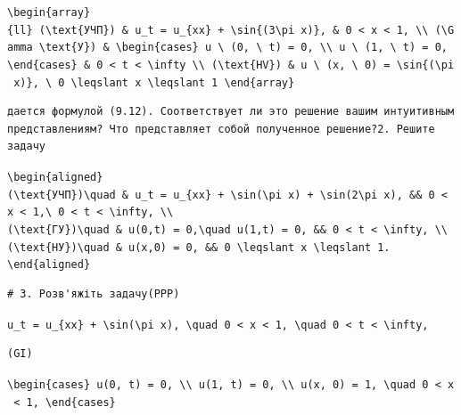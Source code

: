 \documentclass[
  ukrainian,
]{article}
\begin{document}
\texttt{\textbackslash{}begin\{array\}\{ll\}\ (\textbackslash{}text\{УЧП\})\ \&\ u\_t\ =\ u\_\{xx\}\ +\ \textbackslash{}sin\{(3\textbackslash{}pi\ x)\},\ \&\ 0\ \textless{}\ x\ \textless{}\ 1,\ \textbackslash{}\textbackslash{}\ (\textbackslash{}Gamma\ \textbackslash{}text\{У\})\ \&\ \textbackslash{}begin\{cases\}\ u\ \textbackslash{}\ (0,\ \textbackslash{}\ t)\ =\ 0,\ \textbackslash{}\textbackslash{}\ u\ \textbackslash{}\ (1,\ \textbackslash{}\ t)\ =\ 0,\ \textbackslash{}end\{cases\}\ \&\ 0\ \textless{}\ t\ \textless{}\ \textbackslash{}infty\ \textbackslash{}\textbackslash{}\ (\textbackslash{}text\{HV\})\ \&\ u\ \textbackslash{}\ (x,\ \textbackslash{}\ 0)\ =\ \textbackslash{}sin\{(\textbackslash{}pi\ x)\},\ \textbackslash{}\ 0\ \textbackslash{}leqslant\ x\ \textbackslash{}leqslant\ 1\ \textbackslash{}end\{array\}}

\begin{verbatim}
дается формулой (9.12). Соответствует ли это решение вашим интуитивным представлениям? Что представляет собой полученное решение?2. Решите задачу
\end{verbatim}

\texttt{\textbackslash{}begin\{aligned\}}
\texttt{(\textbackslash{}text\{УЧП\})\textbackslash{}quad\ \&\ u\_t\ =\ u\_\{xx\}\ +\ \textbackslash{}sin(\textbackslash{}pi\ x)\ +\ \textbackslash{}sin(2\textbackslash{}pi\ x),\ \&\&\ 0\ \textless{}\ x\ \textless{}\ 1,\textbackslash{}\ 0\ \textless{}\ t\ \textless{}\ \textbackslash{}infty,\ \textbackslash{}\textbackslash{}}
\texttt{(\textbackslash{}text\{ГУ\})\textbackslash{}quad\ \&\ u(0,t)\ =\ 0,\textbackslash{}quad\ u(1,t)\ =\ 0,\ \&\&\ 0\ \textless{}\ t\ \textless{}\ \textbackslash{}infty,\ \textbackslash{}\textbackslash{}}
\texttt{(\textbackslash{}text\{НУ\})\textbackslash{}quad\ \&\ u(x,0)\ =\ 0,\ \&\&\ 0\ \textbackslash{}leqslant\ x\ \textbackslash{}leqslant\ 1.}
\texttt{\textbackslash{}end\{aligned\}}

\begin{verbatim}
# 3. Розв'яжіть задачу(PPP)
\end{verbatim}

\texttt{u\_t\ =\ u\_\{xx\}\ +\ \textbackslash{}sin(\textbackslash{}pi\ x),\ \textbackslash{}quad\ 0\ \textless{}\ x\ \textless{}\ 1,\ \textbackslash{}quad\ 0\ \textless{}\ t\ \textless{}\ \textbackslash{}infty,}

\begin{verbatim}
(GI)
\end{verbatim}

\texttt{\textbackslash{}begin\{cases\}\ u(0,\ t)\ =\ 0,\ \textbackslash{}\textbackslash{}\ u(1,\ t)\ =\ 0,\ \textbackslash{}\textbackslash{}\ u(x,\ 0)\ =\ 1,\ \textbackslash{}quad\ 0\ \textless{}\ x\ \textless{}\ 1,\ \textbackslash{}end\{cases\}}
\end{document}
